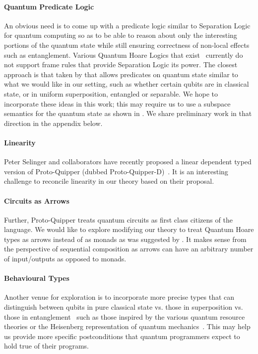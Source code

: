 \documentclass[acmsmall,nonacm,timestamp,review=false,anonymous=false]{acmart}
\begin{document}
\paragraph{Quantum Predicate Logic} An obvious need is to come up with a predicate logic similar to Separation Logic~\cite{reynolds2002} for quantum computing so as to be able to reason about only the interesting portions of the quantum state while still ensuring correctness of non-local effects such as entanglement. Various Quantum Hoare Logics that exist~\cite{ying_floydhoare_2012} currently do not support frame rules that provide Separation Logic its power. The closest approach is that taken by \citet{unruh2019} that allows predicates on quantum state similar to what we would like in our setting, such as whether certain qubits are in classical state, or in uniform superposition, entangled or separable. We hope to incorporate these ideas in this work; this may require us to use a subspace semantics for the quantum state as shown in \citet{unruh2019}. We share preliminary work in that direction in the appendix below.

\paragraph{Linearity} Peter Selinger and collaborators have recently proposed a linear dependent typed version of Proto-Quipper (dubbed Proto-Quipper-D)~\cite{selinger2020,fu2020linear}. It is an interesting challenge to reconcile linearity in our theory based on their proposal.

\paragraph{Circuits as Arrows} Further, Proto-Quipper treats quantum circuits as first class citizens of the language. We would like to explore modifying our theory to treat Quantum Hoare types as arrows instead of as monads as was suggested by \citet{so-arrows}. It makes sense from the perspective of sequential composition as arrows can have an arbitrary number of input/outputs as opposed to monads.

\paragraph{Behavioural Types} Another venue for exploration is to incorporate more precise types that can distinguish between qubits in pure classical state vs. those in superposition vs. those in entanglement~\cite{JorrandPerdrix2009} such as those inspired by the various quantum resource theories or the Heisenberg representation of quantum mechanics~\cite{rand_type_2019,rssl20}. This may help us provide more specific postconditions that quantum programmers expect to hold true of their programs.
\end{document}
